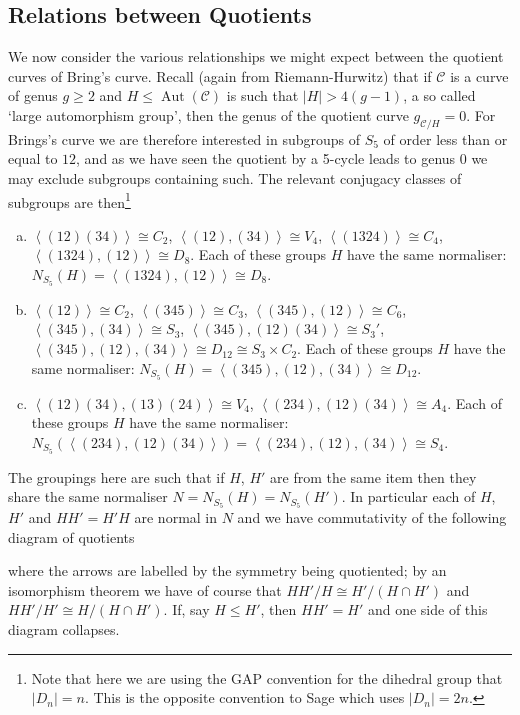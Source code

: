 \documentclass{amsart}
\DeclareMathOperator{\Aut}{Aut}
\newcommand{\pangle}[1]{\left\langle #1 \right\rangle}
\begin{document}
\subsection{Relations between Quotients}\label{subsec: relations between quotients}
We now consider the various relationships we might expect between the quotient curves of Bring's curve.
Recall (again from Riemann-Hurwitz) that if $\mathcal{C}$ is a curve of genus $g\ge2$ and $H\le \Aut(\mathcal{C})$ is such that
$|H|>4(g-1)$, a so called \lq large automorphism group', then the
genus of the quotient curve $g_{\mathcal{C}/H}=0$. For Brings's curve
we are therefore interested in subgroups of $S_5$ of order less than or equal to $12$, and as we have seen the quotient by a 5-cycle leads to genus $0$ we may exclude subgroups containing such. The relevant
conjugacy classes of subgroups are then\footnote{Note that here we are using the GAP convention for the dihedral group that $|{D_n}|=n$. This is the opposite convention to Sage which uses $|{D_{n}}|=2n$.}
\begin{enumerate}[(a)]
    \item $\pangle{(12)(34)}\cong C_2$, $\pangle{(12),(34)}\cong V_4$, $\pangle{(1324)}\cong C_4$, $\pangle{(1324),(12)}\cong D_8$. Each of these groups $H$ have the same normaliser: $N_{S_5}(H)=\pangle{(1324),(12)}\cong D_{8}$.
    \item $\pangle{(12)}\cong C_2$, $\pangle{(345)}\cong C_3$, $\pangle{(345),(12)}\cong C_6$, $\pangle{(345), (34)}\cong S_3$,  $\pangle{(345),(12)(34)}\cong  S_3'$, $\pangle{(345),(12),(34)}\cong D_{12}\cong S_3\times C_2$. Each of these groups $H$ have the same normaliser: $N_{S_5}(H)=\pangle{(345),(12),(34)}\cong D_{12}$.
    
    \item $\pangle{(12)(34), (13)(24)}\cong V_4$, $\pangle{(234),(12)(34)}\cong A_4$. Each of these groups $H$ have the same normaliser: $N_{S_5}(\pangle{(234),(12)(34)}) = \pangle{(234), (12), (34)} \cong S_4$.
\end{enumerate}
The groupings here are such that if $H$, $H'$ are from the same item then they share the same normaliser $N=N_{S_5}(H)=N_{S_5}(H')$. In particular each of $H$, $H'$ and $HH'=H'H$ are normal in $N$ and we have commutativity of the following diagram of quotients
\begin{center}
\end{center}
where the arrows are labelled by the symmetry being quotiented; by an isomorphism theorem we have of course that $HH'/H\cong H'/(H\cap H')$
and $HH'/H' \cong H/(H\cap H')$. If, say $H\le H'$, then $HH'=H'$ and one
side of this diagram collapses.
\end{document}
